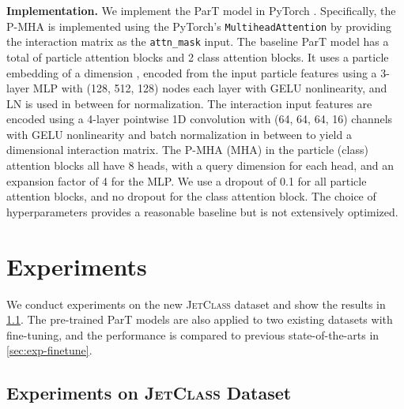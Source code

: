 \documentclass[nohyperref]{article}
\theoremstyle{plain}
\theoremstyle{definition}
\theoremstyle{remark}
\newcommand{\jetclass}{{\textsc{JetClass}}\xspace}
\begin{document}
\textbf{Implementation.} We implement the ParT model in PyTorch \cite{NEURIPS2019_9015}. Specifically, the P-MHA is implemented using the PyTorch's \texttt{MultiheadAttention} by providing the interaction matrix  as the \texttt{attn\_mask} input. The baseline ParT model has a total of  particle attention blocks and 2 class attention blocks. It uses a particle embedding of a dimension , encoded from the input particle features using a 3-layer MLP with (128, 512, 128) nodes each layer with GELU nonlinearity, and LN is used in between for normalization. The interaction input features are encoded using a 4-layer pointwise 1D convolution with (64, 64, 64, 16) channels with GELU nonlinearity and batch normalization in between to yield a  dimensional interaction matrix. The P-MHA (MHA) in the particle (class) attention blocks all have 8 heads, with a query dimension  for each head, and an expansion factor of 4 for the MLP. We use a dropout of 0.1 for all particle attention blocks, and no dropout for the class attention block.
The choice of hyperparameters provides a reasonable baseline but is not extensively optimized.

\section{Experiments}
\label{sec:experiments}

We conduct experiments on the new \jetclass dataset and show the results in \cref{sec:exp-jet-class}. The pre-trained ParT models are also applied to two existing datasets with fine-tuning, and the performance is compared to previous state-of-the-arts in \cref{sec:exp-finetune}.

\subsection{Experiments on \textsc{JetClass} Dataset}
\label{sec:exp-jet-class}
\end{document}
